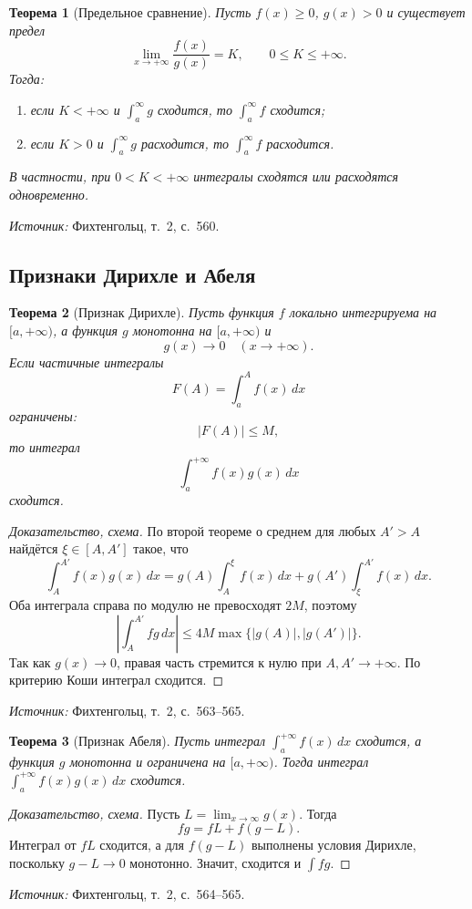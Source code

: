 \documentclass[12pt,a4paper]{article}
\newcommand{\source}[1]{\par\noindent\textit{Источник:} #1.}
\theoremstyle{definition}
\theoremstyle{plain}
\newtheorem{theorem}{Теорема}[section]
\theoremstyle{remark}
\begin{document}
\begin{theorem}[Предельное сравнение]
Пусть \(f(x)\ge0\), \(g(x)>0\) и существует предел
\[
\lim_{x\to+\infty}\frac{f(x)}{g(x)}=K,\qquad 0\le K\le+\infty.
\]
Тогда:
\begin{enumerate}
\item если \(K<+\infty\) и \(\int_a^\infty g\) сходится, то \(\int_a^\infty f\) сходится;
\item если \(K>0\) и \(\int_a^\infty g\) расходится, то \(\int_a^\infty f\) расходится.
\end{enumerate}
В частности, при \(0<K<+\infty\) интегралы сходятся или расходятся одновременно.
\end{theorem}
\source{Фихтенгольц, т.~2, с.~560}

\subsection{Признаки Дирихле и Абеля}

\begin{theorem}[Признак Дирихле]
Пусть функция \(f\) локально интегрируема на \([a,+\infty)\), а функция \(g\) монотонна на \([a,+\infty)\) и
\[
g(x)\to0\quad (x\to+\infty).
\]
Если частичные интегралы
\[
F(A)=\int_a^A f(x)\,dx
\]
ограничены:
\[
|F(A)|\le M,
\]
то интеграл
\[
\int_a^{+\infty}f(x)g(x)\,dx
\]
сходится.
\end{theorem}

\begin{proof}[Доказательство, схема]
По второй теореме о среднем для любых \(A'>A\) найдётся \(\xi\in[A,A']\) такое, что
\[
\int_A^{A'}f(x)g(x)\,dx
=
g(A)\int_A^\xi f(x)\,dx
+
g(A')\int_\xi^{A'}f(x)\,dx.
\]
Оба интеграла справа по модулю не превосходят \(2M\), поэтому
\[
\left|\int_A^{A'}f g\,dx\right|
\le 4M\max\{|g(A)|,|g(A')|\}.
\]
Так как \(g(x)\to0\), правая часть стремится к нулю при \(A,A'\to+\infty\). По критерию Коши интеграл сходится.
\end{proof}
\source{Фихтенгольц, т.~2, с.~563--565}

\begin{theorem}[Признак Абеля]
Пусть интеграл \(\int_a^{+\infty}f(x)\,dx\) сходится, а функция \(g\) монотонна и ограничена на \([a,+\infty)\). Тогда интеграл \(\int_a^{+\infty}f(x)g(x)\,dx\) сходится.
\end{theorem}

\begin{proof}[Доказательство, схема]
Пусть \(L=\lim_{x\to\infty}g(x)\). Тогда
\[
fg=fL+f(g-L).
\]
Интеграл от \(fL\) сходится, а для \(f(g-L)\) выполнены условия Дирихле, поскольку \(g-L\to0\) монотонно. Значит, сходится и \(\int fg\).
\end{proof}
\source{Фихтенгольц, т.~2, с.~564--565}
\end{document}
